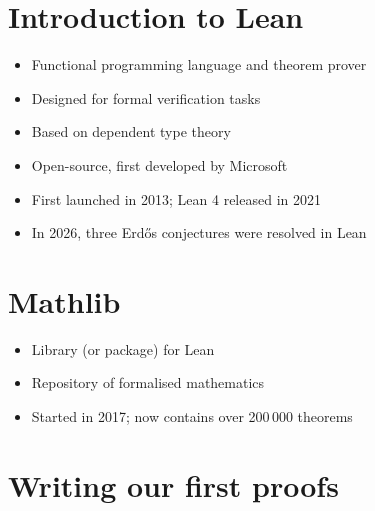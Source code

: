 \documentclass[12pt]{article}
\begin{document}
\section{Introduction to Lean}

\begin{itemize}
  \item Functional programming language and theorem prover
  \item Designed for formal verification tasks
  \item Based on dependent type theory
  \item Open-source, first developed by Microsoft
  \item First launched in 2013; Lean 4 released in 2021
  \item In 2026, three Erd{\H o}s conjectures were resolved in Lean
\end{itemize}

\section{Mathlib}
\begin{itemize}
  \item Library (or package) for Lean
  \item Repository of formalised mathematics
  \item Started in 2017; now contains over 200\,000 theorems
\end{itemize}

\pagebreak

\section{Writing our first proofs}

\pagebreak
\end{document}

